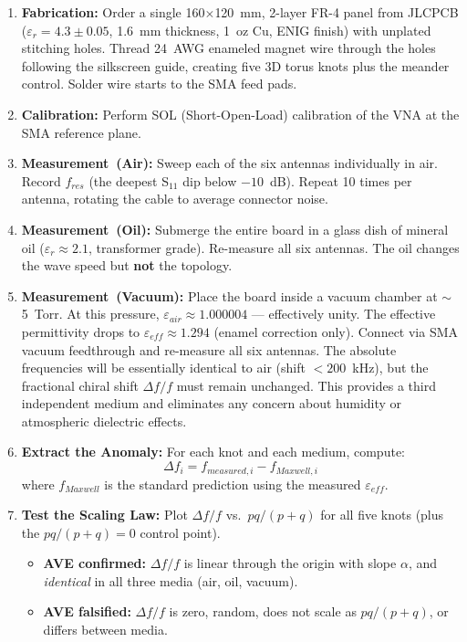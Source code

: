 \begin{enumerate}
    \item \textbf{Fabrication:} Order a single 160$\times$120~mm, 2-layer FR-4 panel from JLCPCB ($\varepsilon_r = 4.3 \pm 0.05$, 1.6~mm thickness, 1~oz Cu, ENIG finish) with unplated stitching holes. Thread 24~AWG enameled magnet wire through the holes following the silkscreen guide, creating five 3D torus knots plus the meander control. Solder wire starts to the SMA feed pads.

    \item \textbf{Calibration:} Perform SOL (Short-Open-Load) calibration of the VNA at the SMA reference plane.

    \item \textbf{Measurement~(Air):} Sweep each of the six antennas individually in air. Record $f_{res}$ (the deepest S$_{11}$ dip below $-10$~dB). Repeat 10 times per antenna, rotating the cable to average connector noise.

    \item \textbf{Measurement~(Oil):} Submerge the entire board in a glass dish of mineral oil ($\varepsilon_r \approx 2.1$, transformer grade). Re-measure all six antennas. The oil changes the wave speed but \textbf{not} the topology.

    \item \textbf{Measurement~(Vacuum):} Place the board inside a vacuum chamber at $\sim$5~Torr. At this pressure, $\varepsilon_{air} \approx 1.000004$ --- effectively unity. The effective permittivity drops to $\varepsilon_{eff} \approx 1.294$ (enamel correction only). Connect via SMA vacuum feedthrough and re-measure all six antennas. The absolute frequencies will be essentially identical to air (shift $< 200$~kHz), but the fractional chiral shift $\Delta f/f$ must remain unchanged. This provides a third independent medium and eliminates any concern about humidity or atmospheric dielectric effects.

    \item \textbf{Extract the Anomaly:} For each knot and each medium, compute:
    \begin{equation}
        \Delta f_i = f_{measured,i} - f_{Maxwell,i}
    \end{equation}
    where $f_{Maxwell}$ is the standard prediction using the measured $\varepsilon_{eff}$.

    \item \textbf{Test the Scaling Law:} Plot $\Delta f / f$ vs.\ $pq/(p+q)$ for all five knots (plus the $pq/(p+q)=0$ control point).
    \begin{itemize}
        \item \textbf{AVE confirmed:} $\Delta f/f$ is linear through the origin with slope $\alpha$, and \textit{identical} in all three media (air, oil, vacuum).
        \item \textbf{AVE falsified:} $\Delta f/f$ is zero, random, does not scale as $pq/(p+q)$, or differs between media.
    \end{itemize}


\end{enumerate}
